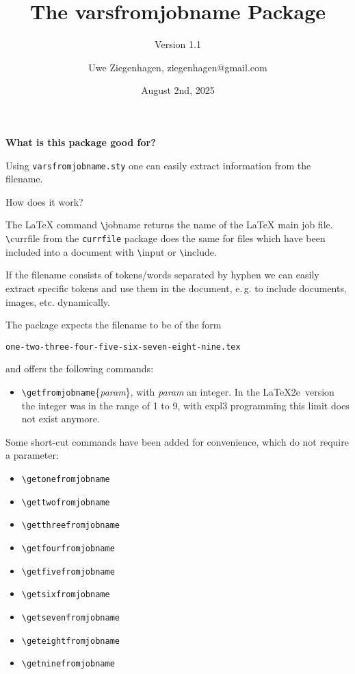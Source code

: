 \documentclass[12pt]{scrartcl}
\date{August 2nd, 2025 }
\author{Uwe Ziegenhagen, ziegenhagen@gmail.com}
\title{The varsfromjobname Package}
\subtitle{Version 1.1}
\begin{document}
\maketitle



\textbf{What is this package good for?}

\noindent Using \texttt{varsfromjobname.sty} one can easily extract information from the filename.

How does it work?

The LaTeX command \verb|\|jobname returns the name of the LaTeX main job file.  \verb|\|currfile from the \texttt{currfile} package does the same for files which have been included into a document with \verb|\|input or \verb|\|include.

If the filename consists of tokens/words separated by hyphen we can easily extract specific tokens and use them in the document, e.\,g. to include documents, images, etc. dynamically.

The package expects the filename to be of the form 

\noindent\texttt{one-two-three-four-five-six-seven-eight-nine.tex} 

\noindent and offers the following commands:

\begin{itemize}
	\item \verb|\getfromjobname|\{\textit{param}\}, with \textit{param} an integer. In the \LaTeX2e\ version the integer was in the range of 1 to 9, with expl3 programming this limit does not exist anymore.

\end{itemize}

Some short-cut commands have been added for convenience, which do not require a parameter:

\begin{itemize}
	\item \verb|\getonefromjobname|
	\item \verb|\gettwofromjobname|
	\item \verb|\getthreefromjobname|
	\item \verb|\getfourfromjobname|
	\item \verb|\getfivefromjobname|
	\item \verb|\getsixfromjobname|
	\item \verb|\getsevenfromjobname|
	\item \verb|\geteightfromjobname|
	\item \verb|\getninefromjobname|	
\end{itemize}
\end{document}
